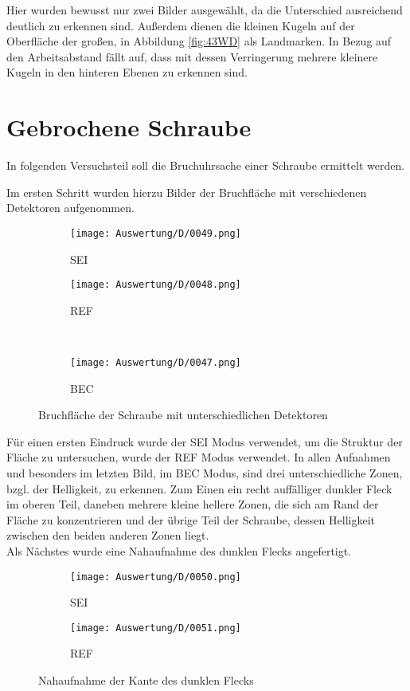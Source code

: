 Hier wurden bewusst nur zwei Bilder ausgewählt, da die Unterschied ausreichend deutlich zu erkennen sind. Außerdem dienen die kleinen Kugeln auf der Oberfläche der großen, in Abbildung \ref{fig:43WD} als Landmarken.
In Bezug auf den Arbeitsabstand fällt auf, dass mit dessen Verringerung mehrere kleinere Kugeln in den hinteren Ebenen zu erkennen sind.

\newpage
\section{Gebrochene Schraube}

In folgenden Versuchsteil soll die Bruchuhrsache einer Schraube ermittelt werden.

Im ersten Schritt wurden hierzu Bilder der Bruchfläche mit verschiedenen Detektoren aufgenommen.
\begin{figure}[h]
    \centering
    
    \begin{subfigure}[b]{0.45\textwidth}
        \centering
        \texttt{[image: Auswertung/D/0049.png]}
        \caption{SEI}
    \end{subfigure}
    \hfill
    \begin{subfigure}[b]{0.45\textwidth}
        \centering
        \texttt{[image: Auswertung/D/0048.png]}
        \caption{REF}
    \end{subfigure}
    \\
    \begin{subfigure}[b]{0.45\textwidth}
        \centering
        \texttt{[image: Auswertung/D/0047.png]}
        \caption{BEC}
    \end{subfigure}
    \caption{Bruchfläche der Schraube mit unterschiedlichen Detektoren}
\end{figure}
Für einen ersten Eindruck wurde der SEI Modus verwendet, um die Struktur der Fläche zu untersuchen, wurde der REF Modus verwendet. In allen Aufnahmen und besonders im letzten Bild, im BEC Modus, sind drei unterschiedliche Zonen, bzgl. der Helligkeit, zu erkennen. Zum Einen ein recht auffälliger dunkler Fleck im oberen Teil, daneben mehrere kleine hellere Zonen, die sich am Rand der Fläche zu konzentrieren und der übrige Teil der Schraube, dessen Helligkeit zwischen den beiden anderen Zonen liegt. \\

\newpage
Als Nächstes wurde eine Nahaufnahme des dunklen Flecks angefertigt.
\begin{figure}[h]
    \centering
    
    \begin{subfigure}[b]{0.45\textwidth}
        \centering
        \texttt{[image: Auswertung/D/0050.png]}
        \caption{SEI}
    \end{subfigure}
    \hfill
    \begin{subfigure}[b]{0.45\textwidth}
        \centering
        \texttt{[image: Auswertung/D/0051.png]}
        \caption{REF}
    \end{subfigure}
    \caption{Nahaufnahme der Kante des dunklen Flecks}
\end{figure}

